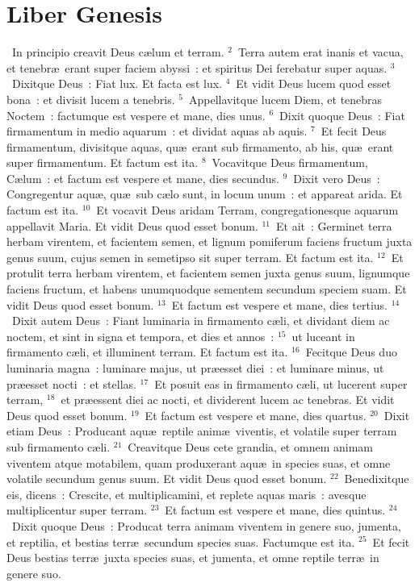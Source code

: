 \clearpage
{\centering \section*{Liber Genesis}}\thispagestyle{empty}

~In principio creavit Deus c\ae lum et terram.
${}^{2}$~Terra autem erat inanis et vacua, et tenebr\ae\ erant super faciem abyssi~: et spiritus Dei ferebatur super aquas.
${}^{3}$~Dixitque Deus~: Fiat lux. Et facta est lux.
${}^{4}$~Et vidit Deus lucem quod esset bona~: et divisit lucem a tenebris.
${}^{5}$~Appellavitque lucem Diem, et tenebras Noctem~: factumque est vespere et mane, dies unus.
${}^{6}$~Dixit quoque Deus~: Fiat firmamentum in medio aquarum~: et dividat aquas ab aquis.
${}^{7}$~Et fecit Deus firmamentum, divisitque aquas, qu\ae\ erant sub firmamento, ab his, qu\ae\ erant super firmamentum. Et factum est ita.
${}^{8}$~Vocavitque Deus firmamentum, C\ae lum~: et factum est vespere et mane, dies secundus.
${}^{9}$~Dixit vero Deus~: Congregentur aqu\ae , qu\ae\ sub c\ae lo sunt, in locum unum~: et appareat arida. Et factum est ita.
${}^{10}$~Et vocavit Deus aridam Terram, congregationesque aquarum appellavit Maria. Et vidit Deus quod esset bonum.
${}^{11}$~Et ait~: Germinet terra herbam virentem, et facientem semen, et lignum pomiferum faciens fructum juxta genus suum, cujus semen in semetipso sit super terram. Et factum est ita.
${}^{12}$~Et protulit terra herbam virentem, et facientem semen juxta genus suum, lignumque faciens fructum, et habens unumquodque sementem secundum speciem suam. Et vidit Deus quod esset bonum.
${}^{13}$~Et factum est vespere et mane, dies tertius.
${}^{14}$~Dixit autem Deus~: Fiant luminaria in firmamento c\ae li, et dividant diem ac noctem, et sint in signa et tempora, et dies et annos~:
${}^{15}$~ut luceant in firmamento c\ae li, et illuminent terram. Et factum est ita.
${}^{16}$~Fecitque Deus duo luminaria magna~: luminare majus, ut pr\ae esset diei~: et luminare minus, ut pr\ae esset nocti~: et stellas.
${}^{17}$~Et posuit eas in firmamento c\ae li, ut lucerent super terram,
${}^{18}$~et pr\ae essent diei ac nocti, et dividerent lucem ac tenebras. Et vidit Deus quod esset bonum.
${}^{19}$~Et factum est vespere et mane, dies quartus.
${}^{20}$~Dixit etiam Deus~: Producant aqu\ae\ reptile anim\ae\ viventis, et volatile super terram sub firmamento c\ae li.
${}^{21}$~Creavitque Deus cete grandia, et omnem animam viventem atque motabilem, quam produxerant aqu\ae\ in species suas, et omne volatile secundum genus suum. Et vidit Deus quod esset bonum.
${}^{22}$~Benedixitque eis, dicens~: Crescite, et multiplicamini, et replete aquas maris~: avesque multiplicentur super terram.
${}^{23}$~Et factum est vespere et mane, dies quintus.
${}^{24}$~Dixit quoque Deus~: Producat terra animam viventem in genere suo, jumenta, et reptilia, et bestias terr\ae\ secundum species suas. Factumque est ita.
${}^{25}$~Et fecit Deus bestias terr\ae\ juxta species suas, et jumenta, et omne reptile terr\ae\ in genere suo.

